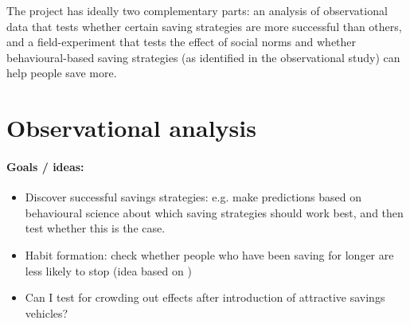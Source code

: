 \documentclass[a4paper, 11pt]{report}
\begin{document}
The project has ideally two complementary parts: an analysis of observational data that tests whether certain saving strategies are more successful than others, and a field-experiment that tests the effect of social norms and whether behavioural-based saving strategies (as identified in the observational study) can help people save more.


\section{Observational analysis}

\paragraph{Goals / ideas:}
\begin{itemize}
	\item Discover successful savings strategies: e.g. make predictions based on behavioural science about which saving strategies should work best, and then test whether this is the case.

	\item Habit formation: check whether people who have been saving for longer are less likely to stop (idea based on \citet{blumenstock2018defaults})

	\item Can I test for crowding out effects after introduction of attractive savings vehicles?

\end{itemize}
\end{document}
